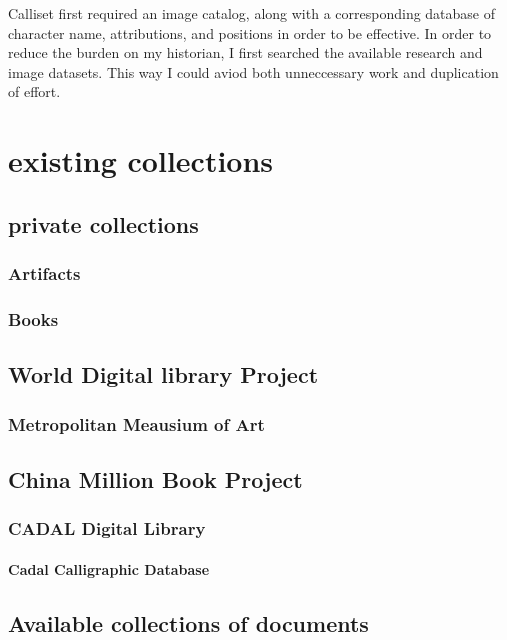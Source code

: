 
Calliset first required an image catalog, along with a corresponding database of character name, attributions, and positions in order to be effective.  In order to reduce the burden on my historian, I first searched the available research and image datasets.  This way I could aviod both unneccessary work and duplication of effort.


\chapter{existing collections}

\section{private collections}

\subsection{Artifacts}

\subsection{Books}

\section{World Digital library Project}

\subsection{Metropolitan Meausium of Art}

\section{China Million Book Project}

\subsection{CADAL Digital Library}

\subsubsection{Cadal Calligraphic Database}

\section{Available collections of documents}

